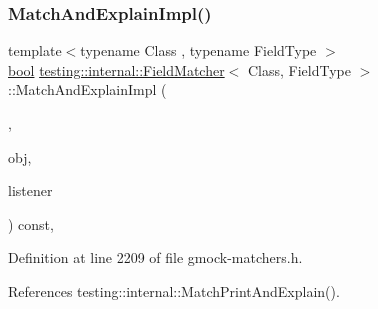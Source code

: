\subsubsection{\texorpdfstring{Match\+And\+Explain\+Impl()}{MatchAndExplainImpl()}\hspace{0.1cm}{\footnotesize\ttfamily [1/2]}}
{\footnotesize\ttfamily template$<$typename Class , typename Field\+Type $>$ \\
\hyperlink{classbool}{bool} \hyperlink{classtesting_1_1internal_1_1FieldMatcher}{testing\+::internal\+::\+Field\+Matcher}$<$ Class, Field\+Type $>$\+::Match\+And\+Explain\+Impl (\begin{DoxyParamCaption}\item[{\hyperlink{namespacetesting_1_1internal_abb1d0789f19bdde21affccbd1078b525}{false\+\_\+type}}]{,  }\item[{const Class \&}]{obj,  }\item[{\hyperlink{classtesting_1_1MatchResultListener}{Match\+Result\+Listener} $\ast$}]{listener }\end{DoxyParamCaption}) const\hspace{0.3cm}{\ttfamily [inline]}, {\ttfamily [private]}}



Definition at line 2209 of file gmock-\/matchers.\+h.



References testing\+::internal\+::\+Match\+Print\+And\+Explain().


